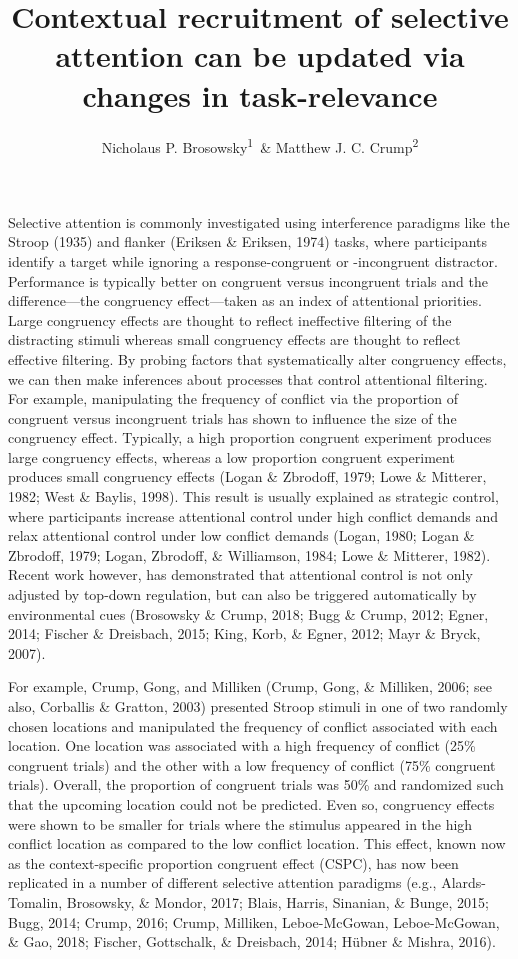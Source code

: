 \documentclass[english,,man,floatsintext]{apa6}
\title{Contextual recruitment of selective attention can be updated via changes in task-relevance}
\author{Nicholaus P. Brosowsky\textsuperscript{1}~\& Matthew J. C. Crump\textsuperscript{2}}
\date{}
\affiliation{
\vspace{0.5cm}
\textsuperscript{1} The Graduate Center of the City University of New York\\\textsuperscript{2} Brooklyn College of the City University of New York}
\begin{document}
\maketitle

Selective attention is commonly investigated using interference paradigms like the Stroop (1935) and flanker (Eriksen \& Eriksen, 1974) tasks, where participants identify a target while ignoring a response-congruent or -incongruent distractor. Performance is typically better on congruent versus incongruent trials and the difference---the congruency effect---taken as an index of attentional priorities. Large congruency effects are thought to reflect ineffective filtering of the distracting stimuli whereas small congruency effects are thought to reflect effective filtering. By probing factors that systematically alter congruency effects, we can then make inferences about processes that control attentional filtering. For example, manipulating the frequency of conflict via the proportion of congruent versus incongruent trials has shown to influence the size of the congruency effect. Typically, a high proportion congruent experiment produces large congruency effects, whereas a low proportion congruent experiment produces small congruency effects (Logan \& Zbrodoff, 1979; Lowe \& Mitterer, 1982; West \& Baylis, 1998). This result is usually explained as strategic control, where participants increase attentional control under high conflict demands and relax attentional control under low conflict demands (Logan, 1980; Logan \& Zbrodoff, 1979; Logan, Zbrodoff, \& Williamson, 1984; Lowe \& Mitterer, 1982). Recent work however, has demonstrated that attentional control is not only adjusted by top-down regulation, but can also be triggered automatically by environmental cues (Brosowsky \& Crump, 2018; Bugg \& Crump, 2012; Egner, 2014; Fischer \& Dreisbach, 2015; King, Korb, \& Egner, 2012; Mayr \& Bryck, 2007).

For example, Crump, Gong, and Milliken (Crump, Gong, \& Milliken, 2006; see also, Corballis \& Gratton, 2003) presented Stroop stimuli in one of two randomly chosen locations and manipulated the frequency of conflict associated with each location. One location was associated with a high frequency of conflict (25\% congruent trials) and the other with a low frequency of conflict (75\% congruent trials). Overall, the proportion of congruent trials was 50\% and randomized such that the upcoming location could not be predicted. Even so, congruency effects were shown to be smaller for trials where the stimulus appeared in the high conflict location as compared to the low conflict location. This effect, known now as the context-specific proportion congruent effect (CSPC), has now been replicated in a number of different selective attention paradigms (e.g., Alards-Tomalin, Brosowsky, \& Mondor, 2017; Blais, Harris, Sinanian, \& Bunge, 2015; Bugg, 2014; Crump, 2016; Crump, Milliken, Leboe-McGowan, Leboe-McGowan, \& Gao, 2018; Fischer, Gottschalk, \& Dreisbach, 2014; Hübner \& Mishra, 2016).
\end{document}
